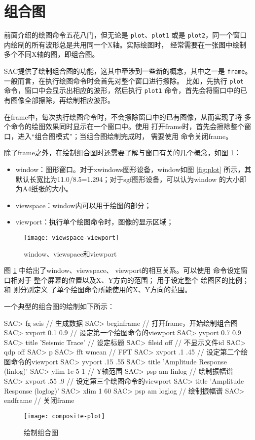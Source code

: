 \section{组合图}
\label{sec:composite-plots}

前面介绍的绘图命令五花八门，但无论是 \texttt{plot}、\texttt{plot1} 或是
\texttt{plot2}，同一个窗口内绘制的所有波形总是共用同一个X轴。实际绘图时，
经常需要在一张图中绘制多个不同X轴的图，即组合图。

SAC提供了绘制组合图的功能，这其中牵涉到一些新的概念，其中之一是
\texttt{frame}。一般而言，在执行绘图命令时会首先对整个窗口进行擦除。
比如，先执行 \texttt{plot} 命令，窗口中会显示出相应的波形，然后执行
\texttt{plot1} 命令，首先会将窗口中的已有图像全部擦除，再绘制相应波形。

在frame中，每次执行绘图命令时，不会擦除窗口中的已有图像，从而实现了将
多个命令的绘图效果同时显示在一个窗口中。使用 
打开frame时，首先会擦除整个窗口，进入``组合图模式''；当组合图绘制完成时，
需要使用  命令关闭frame。

除了frame之外，在绘制组合图时还需要了解与窗口有关的几个概念，如图
\ref{fig:window-viewspace-viewport}：
\begin{itemize}
\item window：图形窗口。对于xwindows图形设备，window如图 \ref{fig:plot}
    所示，其默认长宽比为11.0/8.5=1.294；对于sgf图形设备，可以认为window
    的大小即为A4纸张的大小。
\item viewspace：window内可以用于绘图的部分；
\item viewport：执行单个绘图命令时，图像的显示区域；
\end{itemize}

\begin{figure}[H]
\centering
\texttt{[image: viewspace-viewport]}
\caption{window、viewspace和viewport}
\label{fig:window-viewspace-viewport}
\end{figure}

图 \ref{fig:window-viewspace-viewport} 中给出了window、viewspace、
viewport的相互关系。可以使用  命令设定窗口相对于
整个屏幕的位置以及X、Y方向的范围； 用于设定整个
绘图区的比例； 和  则分别定义
了单个绘图命令所能使用的X、Y方向的范围。

一个典型的组合图的绘制如下所示：
\begin{SACCode}
SAC> fg seis                        // 生成数据
SAC> beginframe                     // 打开frame，开始绘制组合图
SAC> xvport 0.1 0.9                 // 设定第一个绘图命令的viewport
SAC> yvport 0.7 0.9
SAC> title 'Seismic Trace'          // 设定标题
SAC> fileid off                     // 不显示文件id
SAC> qdp off
SAC> p
SAC> fft wmean                      // FFT
SAC> xvport .1 .45                  // 设定第二个绘图命令的viewport
SAC> yvport .15 .55
SAC> title 'Amplitude Response (linlog)'
SAC> ylim 1e-5 1                    // Y轴范围
SAC> psp am linlog                  // 绘制振幅谱
SAC> xvport .55 .9                  // 设定第三个绘图命令的viewport
SAC> title 'Amplitude Response (loglog)'
SAC> xlim 1 60
SAC> psp am loglog                  // 绘制振幅谱
SAC> endframe                       // 关闭frame
\end{SACCode}

\begin{figure}[H]
\centering
\texttt{[image: composite-plot]}
\caption{绘制组合图}
\label{fig:composite-plot}
\end{figure}
